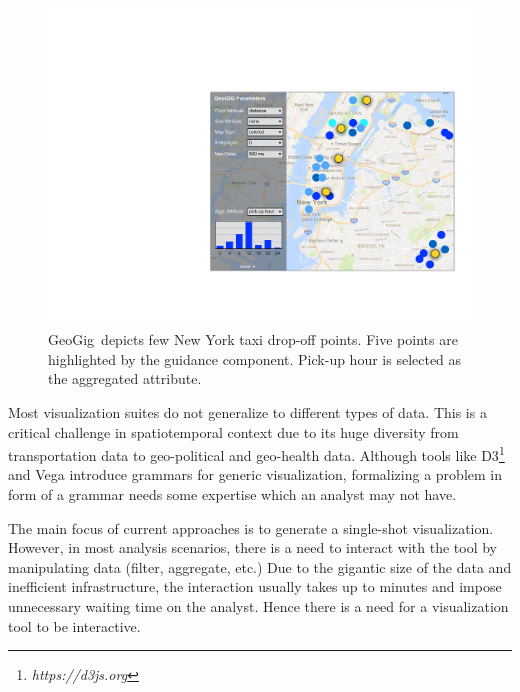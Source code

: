 \documentclass[conference]{IEEEtran}
\newcommand{\sys}{{\sc GeoGig}}
\begin{document}
  \begin{figure}
   \centering
   \includegraphics[width=\columnwidth]{figs/dashboard}
 \caption{\small \sys\ depicts few New York taxi drop-off points. Five points are highlighted by the guidance component. Pick-up hour is selected as the aggregated attribute.}
 \label{fig:dashboard}
 \vspace{-15pt}
 \end{figure}


 Most visualization suites do not generalize to different types of data. This is a critical challenge in spatiotemporal context due to its huge diversity from transportation data to geo-political and geo-health data. Although tools like {\sc D3}\footnote{\it https://d3js.org} and {\sc Vega} \cite{satyanarayan2016reactive} introduce grammars for generic visualization, formalizing a problem in form of a grammar needs some expertise which an analyst may not have.

 The main focus of current approaches is to generate a single-shot visualization. However, in most analysis scenarios, there is a need to interact with the tool by manipulating data (filter, aggregate, etc.) Due to the gigantic size of the data and inefficient infrastructure, the interaction usually takes up to minutes and impose unnecessary waiting time on the analyst. Hence there is a need for a visualization tool to be interactive.
\end{document}

